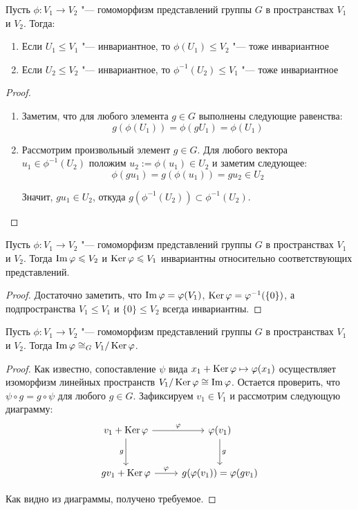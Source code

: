 \begin{proposition}
	Пусть $\phi: V_1 \to V_2$ "--- гомоморфизм представлений группы $G$ в пространствах $V_1$ и $V_2$. Тогда:
	\begin{enumerate}
		\item Если $U_1 \le V_1$ "--- инвариантное, то $\phi(U_1) \le V_2$ "--- тоже инвариантное
		\item Если $U_2 \le V_2$ "--- инвариантное, то $\phi^{-1}(U_2) \le V_1$ "--- тоже инвариантное
	\end{enumerate}
\end{proposition}

\begin{proof}~
	\begin{enumerate}
		\item Заметим, что для любого элемента $g \in G$ выполнены следующие равенства:
		\[g(\phi(U_1)) = \phi(gU_1) = \phi(U_1)\]
		\item Рассмотрим произвольный элемент $g \in G$. Для любого вектора $u_1 \in \phi^{-1}(U_2)$ положим $u_2 := \phi(u_1) \in U_2$ и заметим следующее:
		\[\phi(gu_1) = g(\phi(u_1)) = gu_2 \in U_2\]
		
		Значит, $gu_1 \in U_2$, откуда $g(\phi^{-1}(U_2)) \subset \phi^{-1}(U_2)$.\qedhere
	\end{enumerate}
\end{proof}

\begin{corollary}
	Пусть $\phi: V_1 \to V_2$ "--- гомоморфизм представлений группы $G$ в пространствах $V_1$ и $V_2$. Тогда $\operatorname{Im}\varphi \leqslant V_2$ и $\operatorname{Ker}\varphi \leqslant V_1$ инвариантны относительно соответствующих представлений.
\end{corollary}

\begin{proof}
	Достаточно заметить, что $\operatorname{Im}\varphi = \varphi(V_1)$, $\operatorname{Ker}\varphi = \varphi^{-1}(\{0\})$, а подпространства $V_1 \le V_1$ и $\{0\} \le V_2$ всегда инвариантны.
\end{proof}

\begin{theorem}
	Пусть $\phi: V_1 \to V_2$ "--- гомоморфизм представлений группы $G$ в пространствах $V_1$ и $V_2$. Тогда $\operatorname{Im}\varphi \cong_G V_1 / \operatorname{Ker}\varphi$.
\end{theorem}

\begin{proof}
	Как известно, сопоставление $\psi$ вида $x_1 + \operatorname{Ker}\varphi \mapsto \varphi(x_1)$ осуществляет изоморфизм линейных пространств $V_1 / \operatorname{Ker}\varphi \cong \operatorname{Im}\varphi$. Остается проверить, что $\psi \circ g = g \circ \psi$ для любого $g \in G$. Зафиксируем $v_1 \in V_1$ и рассмотрим следующую диаграмму:
	\[
	\begin{tikzcd}[row sep = large]
		v_1 + \ke\phi \arrow[swap]{d}{g} \arrow{r}{\phi} & \phi(v_1) \arrow{d}{g}\\
		gv_1 + \ke\phi \arrow{r}{\phi} & g(\phi(v_1)) = \phi(gv_1)
	\end{tikzcd}
	\]
	
	Как видно из диаграммы, получено требуемое.
\end{proof}

